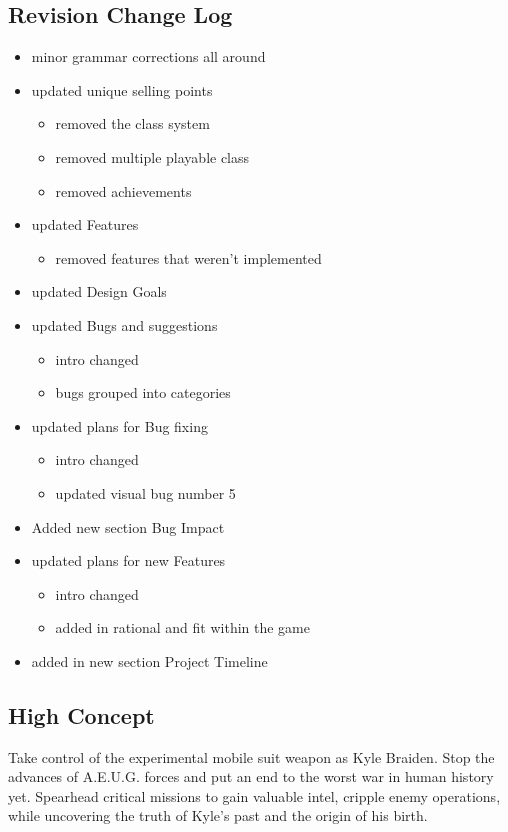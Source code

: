 \documentclass{article}
\begin{document}
\subsection*{Revision Change Log}
\begin{itemize}
	\item minor grammar corrections all around 
	\item updated unique selling points 
	  \begin{itemize}
	  	\item{removed the class system}
	  	\item{removed multiple playable class}
	  	\item{removed achievements}
	  \end{itemize}
	\item  updated Features 
	  \begin{itemize}
	  	\item{removed features that weren't implemented }	
	  \end{itemize}
	  	\item  updated Design Goals
	\item  updated Bugs and suggestions
		  \begin{itemize}
		  	\item{intro changed}
		  	\item{bugs grouped into categories}	
		  \end{itemize}
		  \item updated plans for Bug fixing
		  	  \begin{itemize}
		  	  	\item{intro changed}
		  	  	\item{updated visual bug number 5}	
		  	  \end{itemize}
		  	  \item Added new section Bug Impact
		  	  \item updated plans for new Features 
		  	    	  \begin{itemize}
		  	    	  	\item{intro changed}
		  	    	  	\item{added in rational and fit within the game}	
		  	    	  \end{itemize}
		  	    	  \item added in new section Project Timeline
\end{itemize}


\subsection*{High Concept}
Take control of the experimental mobile suit weapon as Kyle Braiden. Stop the advances of A.E.U.G. forces and put an end to the worst war in human history yet. Spearhead critical missions to gain valuable intel, cripple enemy operations, while uncovering the truth of Kyle’s past and the origin of his birth.
\end{document}
